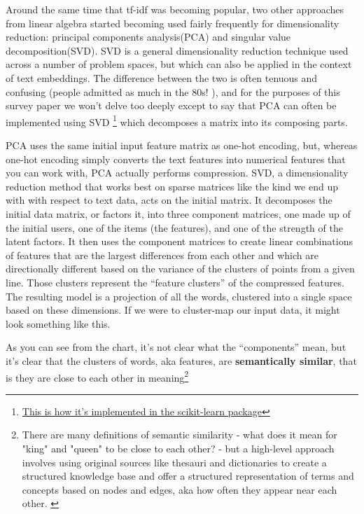 \documentclass[draft, 11pt]{diazessay} %
\begin{document}
Around the same time that tf-idf was becoming popular, two other approaches from linear algebra started becoming used fairly frequently for dimensionality reduction: principal components analysis(PCA) and singular value decomposition(SVD).  SVD is a general dimensionality reduction technique used across a number of problem spaces, but which can also be applied in the context of text embeddings. The difference between the two is often tenuous and confusing (people admitted as much in the 80s! \cite{gerbrands1981relationships}), and for the purposes of this survey paper we won't delve too deeply except to say that PCA can often be implemented using SVD \footnote{\href{https://scikit-learn.org/stable/modules/generated/sklearn.decomposition.PCA.html}{This is how it's implemented in the scikit-learn package}} which decomposes a matrix into its composing parts. 

PCA uses the same initial input feature matrix as one-hot encoding, but, whereas one-hot encoding simply converts the text features into numerical features that you can work with, PCA actually performs compression.  SVD, a dimensionality reduction method that works best on sparse matrices like the kind we end up with with respect to text data,  acts on the initial matrix. It decomposes the initial data matrix, or factors it, into three component matrices, one made up of the initial users, one of the items (the features), and one of the strength of the latent factors. It then uses the component matrices to create linear combinations of features that are the largest differences from each other and which are directionally different based on the variance of the clusters of points from a given line.   Those clusters represent the “feature clusters” of the compressed features.  
The resulting model is a projection of all the words, clustered into a single space based on these dimensions. If we were to cluster-map our input data, it might look something like this. 


As you can see from the chart, it’s not clear what the “components” mean, but it’s clear that the clusters of words, aka features, are \textbf{semantically similar}, that is they are close to each other in meaning\footnote{There are many definitions of semantic similarity - what does it mean for "king" and "queen" to be close to each other? - but a high-level approach involves using original sources like thesauri and dictionaries to create a structured knowledge base and offer a structured representation of terms and concepts based on nodes and edges, aka how often they appear near each other. \cite{handrasekaran2021evolution}}
\end{document}
